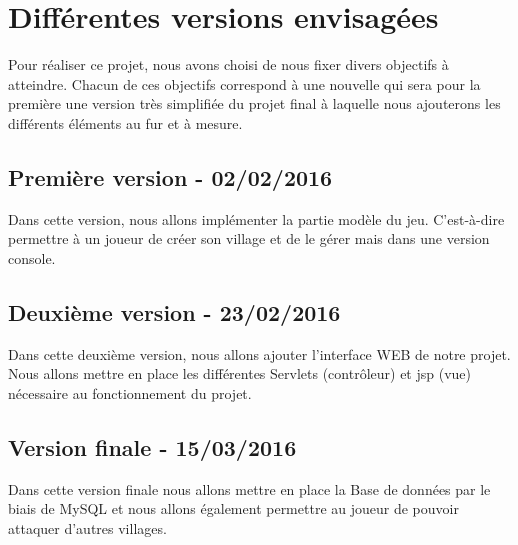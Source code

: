 \chapter{Différentes versions envisagées}
	
	Pour réaliser ce projet, nous avons choisi de nous fixer divers objectifs à atteindre. Chacun de ces objectifs correspond à une nouvelle qui sera pour la première une version très simplifiée du projet final à laquelle nous ajouterons les différents éléments au fur et à mesure.
	
    \section{Première version - 02/02/2016}
    Dans cette version, nous allons implémenter la partie modèle du jeu. C'est-à-dire permettre à un joueur de créer son village et de le gérer mais dans une version console. 
    
    \section{Deuxième version - 23/02/2016}
    Dans cette deuxième version, nous allons ajouter l'interface WEB de notre projet. Nous allons mettre en place les différentes Servlets (contrôleur) et jsp (vue) nécessaire au fonctionnement du projet. 
    
    \section{Version finale - 15/03/2016}
    Dans cette version finale nous allons mettre en place la Base de données par le biais de MySQL et nous allons également permettre au joueur de pouvoir attaquer d'autres villages. 